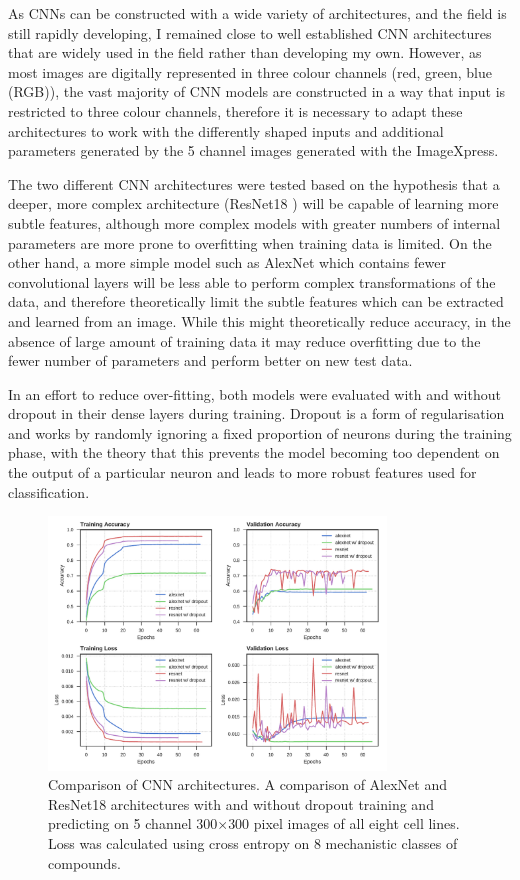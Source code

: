 \documentclass[a4paper,11pt,twoside,openright]{scrbook}
\begin{document}
As CNNs can be constructed with a wide variety of architectures, and the field is still rapidly developing, I remained 
close to well established CNN architectures that are widely used in the field rather than developing my own.
However, as most images are digitally represented in three colour channels (red, green, blue (RGB)), the vast majority 
of CNN models are constructed in a way that input is restricted to three colour channels, therefore it is necessary to 
adapt these architectures to work with the differently shaped inputs and additional parameters generated by the 5 
channel images generated with the ImageXpress.

The two different CNN architectures were tested based on the hypothesis that a deeper, more complex architecture 
(ResNet18 \cite{He2015}) will be capable of learning more subtle features, although more complex models with greater 
numbers of internal parameters are more prone to overfitting when training data is limited.
On the other hand, a more simple model such as AlexNet \cite{Krizhevsky2012} which contains fewer convolutional layers 
will be less able to perform complex transformations of the data, and therefore theoretically limit the subtle features 
which can be extracted and learned from an image.
While this might theoretically reduce accuracy, in the absence of large amount of training data it may reduce 
overfitting due to the fewer number of parameters and perform better on new test data.

In an effort to reduce over-fitting, both models were evaluated with and without dropout in their dense layers during 
training.
Dropout is a form of regularisation and works by randomly ignoring a fixed proportion of neurons during the training 
phase, with the theory that this prevents the model becoming too dependent on the output of a particular neuron and 
leads to more robust features used for classification.

\begin{figure}
    \includegraphics[width=0.8\textwidth]{ch2arch}
    \captionsetup{width=0.8\textwidth}
    \caption[Comparison of CNN architectures]{
Comparison of CNN architectures.
A comparison of AlexNet and ResNet18 architectures with and without dropout training and predicting on 5 channel 
300$\times$300 pixel images of all eight cell lines.
Loss was calculated using cross entropy on 8 mechanistic classes of compounds.}
    \label{figure:nn_arch}
\end{figure}
\end{document}
